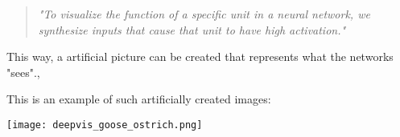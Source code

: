 \begin{quote}
	\emph{"To visualize the function of a specific unit in a neural network, we synthesize inputs that cause that unit to have high activation."} \cite{deepnetworkvisualizing2015} 
\end{quote}

This way, a artificial picture can be created that represents what the networks "sees".\cite{deepnetworkvisualizing2015}, \cite{Simonyan2014}

This is an example of such artificially created images:

\texttt{[image: deepvis\_goose\_ostrich.png]}